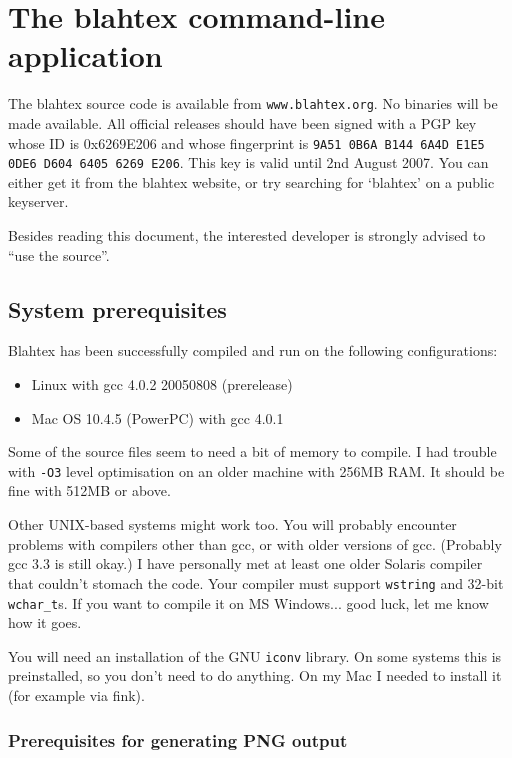 \documentclass{article}
\begin{document}
\section{The blahtex command-line application}\label{sec:command-line}

The blahtex source code is available from \texttt{www.blahtex.org}. No binaries will be made available. All official releases should have been signed with a PGP key  whose ID is 0x6269E206 and whose fingerprint is \texttt{9A51 0B6A B144 6A4D E1E5 0DE6 D604 6405 6269 E206}. This key is valid until 2nd August 2007. You can either get it from the blahtex website, or try searching for `blahtex' on a public keyserver.

Besides reading this document, the interested developer is strongly advised to ``use the source''.

\subsection{System prerequisites}\label{sec:prerequisites}

Blahtex has been successfully compiled and run on the following configurations:
\begin{itemize}
\item Linux with gcc 4.0.2 20050808 (prerelease)
\item Mac OS 10.4.5 (PowerPC) with gcc 4.0.1
\end{itemize}

Some of the source files seem to need a bit of memory to compile. I had trouble with \texttt{-O3} level optimisation on an older machine with 256MB RAM. It should be fine with 512MB or above.

Other UNIX-based systems might work too. You will probably encounter problems with compilers other than gcc, or with older versions of gcc. (Probably gcc 3.3 is still okay.) I have personally met at least one older Solaris compiler that couldn't stomach the code. Your compiler must support \texttt{wstring} and 32-bit \texttt{wchar\_t}s. If you want to compile it on MS Windows... good luck, let me know how it goes.

You will need an installation of the GNU \texttt{iconv} library. On some systems this is preinstalled, so you don't need to do anything. On my Mac I needed to install it (for example via fink).

\subsubsection{Prerequisites for generating PNG output}
\end{document}
